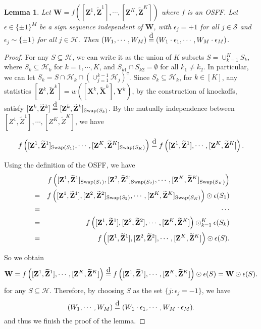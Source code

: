 \documentclass[11pt]{article}
\theoremstyle{plain}
\newtheorem{lemma}[theorem]{Lemma}
\theoremstyle{definition}
\theoremstyle{remark}
\def\Z{\mathbf{Z}}
\def\W{\mathbf{W}}
\newcommand\eqd{\stackrel{\mathclap{\normalfont\mbox{d}}}{=}}
\newcommand{\X}{\mathbf{X}}
\newcommand{\Y}{\mathbf{Y}}
\newcommand{\0}{\mathbf{0}}
\begin{document}
\begin{lemma}\label{lem:1}
Let $\W = f([\Z^1,\widetilde{\Z}^1],\cdots,[\Z^K,\widetilde{\Z}^K])$ where $f$ is an OSFF. Let $\epsilon \in \{\pm 1\}^M$ be a sign sequence independent of $\W$, with $\epsilon_j = +1$ for all $j \in \mathcal{S}$ and $\epsilon_j \sim \{\pm 1\}$ for all $j \in \mathcal{H}$. Then
$(W_1, \cdots, W_M) \eqd (W_1\cdot \epsilon_1, \cdots, W_M\cdot\epsilon_M)$. 
\end{lemma}
\begin{proof}
For any $S\subseteq \mathcal{H}$, we can write it as the union of $K$ subsets $S=\cup_{k=1}^K S_k$, where $S_k\subseteq \mathcal{H}_k$ for $k = 1,\cdots,K$, and $S_{k1}\cap S_{k2} = \emptyset$ for all $k_1 \neq k_2$. In particular, we can let $S_k=S\cap \mathcal{H}_k\cap (\cup_{j=1}^{k-1}\mathcal{H}_j)^c$. 
Since $S_k\subseteq \mathcal{H}_k$, for $k\in [K]$, any statistics $[\Z^k, \widetilde{\Z}^k]=w([\X^k,\widetilde{\X}^k],\Y^k)$, by the construction of knockoffs, satisfy 
$[\Z^k, \widetilde{\Z}^k] \eqd [\Z^k, \widetilde{\Z}^k]_{\textnormal{Swap}(S_k)} $. By the mutually independence between $[Z^1,\widetilde{Z}^1],\cdots, [Z^K,\widetilde{Z}^K]$, we have 

\[f\left([\Z^1,\widetilde{\Z}^1]_{\textnormal{Swap}(S_1)},\cdots,[\Z^K,\widetilde{\Z}^K]_{\textnormal{Swap}(S_K)}\right)\eqd f\left([\Z^1,\widetilde{\Z}^1],\cdots,[\Z^K,\widetilde{\Z}^K]\right).\] 

Using the definition of the OSFF, we have
\begin{eqnarray*}
&&f\left([\Z^1,\widetilde{\Z}^1]_{\textnormal{Swap}(S_1)},[\Z^2,\widetilde{\Z}^2]_{\textnormal{Swap}(S_2)},\cdots,[\Z^K,\widetilde{\Z}^K]_{\textnormal{Swap}(S_K)}\right)\\
&=&f\left([\Z^1,\widetilde{\Z}^1],[\Z^2,\widetilde{\Z}^2]_{\textnormal{Swap}(S_2)},\cdots,[\Z^K,\widetilde{\Z}^K]_{\textnormal{Swap}(S_K)}\right)\odot \epsilon(S_1)\\
&=&\cdots\\
&=&f\left([\Z^1,\widetilde{\Z}^1],[\Z^2,\widetilde{\Z}^2],\cdots,[\Z^K,\widetilde{\Z}^K]\right)\odot_{k=1}^K \epsilon(S_k)\\
&=&f\left([\Z^1,\widetilde{\Z}^1],[\Z^2,\widetilde{\Z}^2],\cdots,[\Z^K,\widetilde{\Z}^K]\right)\odot\epsilon(S).
\end{eqnarray*}

So we obtain \[\W=f\left([\Z^1,\widetilde{\Z}^1],\cdots,[\Z^K,\widetilde{\Z}^K]\right)\eqd f\left([\Z^1,\widetilde{\Z}^1],\cdots,[\Z^K,\widetilde{\Z}^K]\right)\odot\epsilon(S)=\W\odot\epsilon(S).\] for any $S\subseteq \mathcal{H}$. Therefore, by choosing $S$ as the set $\{j:\epsilon_j=-1\}$, we have \[(W_1, \cdots, W_M) \eqd (W_1\cdot \epsilon_1, \cdots, W_M\cdot\epsilon_M).\] and thus we finish the proof of the lemma.
\end{proof}
\end{document}
